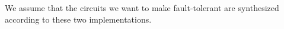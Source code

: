 \documentclass[12pt]{report}
\begin{document}
We assume that the circuits we want to make fault-tolerant are synthesized according to these two implementations. 

\end{document}
